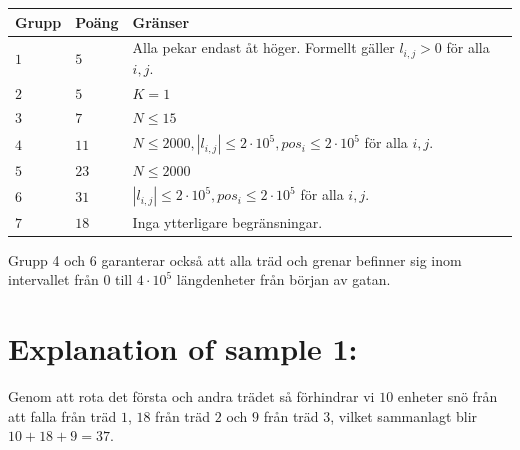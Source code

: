 \noindent
\begin{tabular}{| l | l | p{12cm} |}
  \hline
  \textbf{Grupp} & \textbf{Poäng} & \textbf{Gränser} \\ \hline
  $1$    & $5$        & Alla pekar endast åt höger. Formellt gäller $l_{i,j} > 0$ för alla $i,j$.  \\ \hline
  $2$    & $5$        & $K = 1$ \\ \hline
  $3$    & $7$        & $N \leq 15$ \\ \hline
  $4$    & $11$       & $N \leq 2000, |l_{i,j}| \leq 2 \cdot 10^5, pos_i \leq 2 \cdot 10^5$ för alla $i,j$. \\ \hline %
  $5$    & $23$       & $N \leq 2000$  \\ \hline
  $6$    & $31$       & $ |l_{i,j}| \leq 2 \cdot 10^5, pos_i \leq 2 \cdot 10^5$ för alla $i,j$. \\ \hline
  $7$    & $18$       & Inga ytterligare begränsningar. \\ \hline
\end{tabular}

Grupp 4 och 6 garanterar också att alla träd och grenar befinner sig inom intervallet från $0$ till $4 \cdot 10^5$ längdenheter från början av gatan.

\section*{Explanation of sample 1:}
Genom att rota det första och andra trädet så förhindrar vi $10$ enheter snö från att falla från träd $1$, $18$ från träd $2$ och $9$ från träd $3$,
vilket sammanlagt blir $10+18+9=37$.
